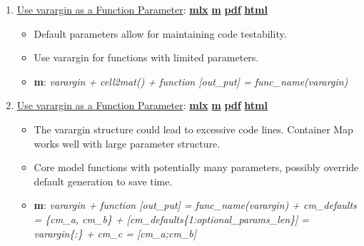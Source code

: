 \documentclass[
]{book}
\providecommand{\tightlist}{%
  \setlength{\itemsep}{0pt}\setlength{\parskip}{0pt}}
\begin{document}
\begin{enumerate}
\def\labelenumi{\arabic{enumi}.}
\tightlist
\item
  \href{https://fanwangecon.github.io/M4Econ/function/defaultparam/htmlpdfm/fs_varargin.html}{Use varargin as a Function Parameter}: \href{https://github.com/FanWangEcon/M4Econ/blob/master/function/defaultparam/fs_varargin.mlx}{\textbf{mlx}} \textbar{} \href{https://github.com/FanWangEcon/M4Econ/blob/master/function/defaultparam/htmlpdfm/fs_varargin.m}{\textbf{m}} \textbar{} \href{https://github.com/FanWangEcon/M4Econ/blob/master/function/defaultparam/htmlpdfm/fs_varargin.pdf}{\textbf{pdf}} \textbar{} \href{https://fanwangecon.github.io/M4Econ/function/defaultparam/htmlpdfm/fs_varargin.html}{\textbf{html}}

  \begin{itemize}
  \tightlist
  \item
    Default parameters allow for maintaining code testability.
  \item
    Use varargin for functions with limited parameters.
  \item
    \textbf{m}: \emph{varargin + cell2mat() + function {[}out\_put{]} = func\_name(varargin)}
  \end{itemize}
\item
  \href{https://fanwangecon.github.io/M4Econ/function/defaultparam/htmlpdfm/fs_defaultmap.html}{Use varargin as a Function Parameter}: \href{https://github.com/FanWangEcon/M4Econ/blob/master/function/defaultparam/fs_defaultmap.mlx}{\textbf{mlx}} \textbar{} \href{https://github.com/FanWangEcon/M4Econ/blob/master/function/defaultparam/htmlpdfm/fs_defaultmap.m}{\textbf{m}} \textbar{} \href{https://github.com/FanWangEcon/M4Econ/blob/master/function/defaultparam/htmlpdfm/fs_defaultmap.pdf}{\textbf{pdf}} \textbar{} \href{https://fanwangecon.github.io/M4Econ/function/defaultparam/htmlpdfm/fs_defaultmap.html}{\textbf{html}}

  \begin{itemize}
  \tightlist
  \item
    The varargin structure could lead to excessive code lines. Container Map works well with large parameter structure.
  \item
    Core model functions with potentially many parameters, possibly override default generation to save time.
  \item
    \textbf{m}: \emph{varargin + function {[}out\_put{]} = func\_name(varargin) + cm\_defaults = \{cm\_a, cm\_b\} + {[}cm\_defaults\{1:optional\_params\_len\}{]} = varargin\{:\} + cm\_c = {[}cm\_a;cm\_b{]}}
  \end{itemize}
\end{enumerate}
\end{document}
